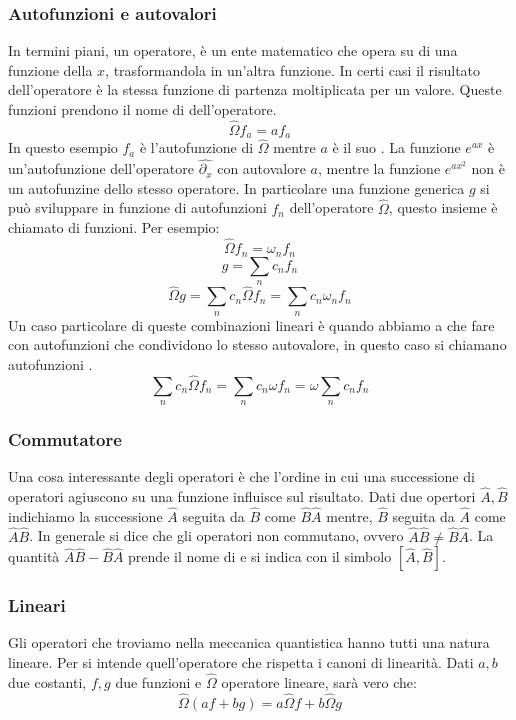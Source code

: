\subsubsection{Autofunzioni e autovalori}
In termini piani, un operatore, è un ente matematico che opera su di una funzione della $x$, trasformandola in un'altra funzione. In certi casi il risultato dell'operatore è la stessa funzione di partenza moltiplicata per un valore. Queste funzioni prendono il nome di \textbf{} dell'operatore.
$$\hat{\Omega} f_a = a f_a$$
In questo esempio $f_a$ è l'autofunzione di $\hat{\Omega}$ mentre $a$ è il suo \textbf{}. La funzione $e^{ax}$ è un'autofunzione dell'operatore $\hat{\partial{}_x}$ con autovalore $a$, mentre la funzione $e^{ax^2}$ non è un autofunzine dello stesso operatore. In particolare una funzione generica $g$ si può sviluppare in funzione di autofunzioni $f_n$ dell'operatore $\hat{\Omega}$, questo insieme è chiamato \textbf{} di funzioni. Per esempio:
$$\hat{\Omega} f_n = \omega_n f_n$$
$$g = \sum_n c_n f_n$$
$$\hat{\Omega} g = \sum_n c_n \hat{\Omega} f_n = \sum_n c_n \omega_n f_n$$
Un caso particolare di queste combinazioni lineari è quando abbiamo a che fare con autofunzioni che condividono lo stesso autovalore, in questo caso si chiamano autofunzioni \textbf{}.
$$\sum_n c_n \hat{\Omega} f_n = \sum_n c_n \omega f_n = \omega \sum_n c_n f_n$$

\subsubsection{Commutatore}
Una cosa interessante degli operatori è che l'ordine in cui una successione di operatori agiuscono su una funzione influisce sul risultato. Dati due opertori $\hat{A}, \hat{B}$ indichiamo la successione $\hat{A}$ seguita da $\hat{B}$ come $\hat{B}\hat{A}$ mentre, $\hat{B}$ seguita da $\hat{A}$ come $\hat{A}\hat{B}$.
In generale si dice che gli operatori non commutano, ovvero $\hat{A}\hat{B} \ne \hat{B}\hat{A}$. La quantità $\hat{A}\hat{B} - \hat{B}\hat{A}$ prende il nome di \textbf{} e si indica con il simbolo $[\hat{A},\hat{B}]$.

\subsubsection{Lineari}
Gli operatori che troviamo nella meccanica quantistica hanno tutti una natura lineare. Per \textbf{} si intende quell'operatore che rispetta i canoni di linearità. Dati $a, b$ due costanti, $f, g$ due funzioni e $\hat{\Omega}$ operatore lineare, sarà vero che:
$$\hat{\Omega}( af + bg ) = a \hat{\Omega} f + b \hat{\Omega} g$$

